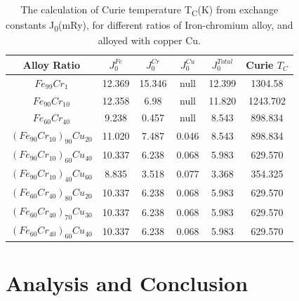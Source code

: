 \documentclass[12pt]{article}
\begin{document}
\begin{table}[h!]
\centering
 \begin{tabular}{||c c c c c c||} 
 \hline
 Alloy Ratio & $J_0^{Fe}$ & $J_0^{Cr}$ & $J_0^{Cu}$ & $J_0^{Total}$ & Curie $T_C$ \\ [1ex] 
 \hline\hline
 $Fe_{99}Cr_1$ & 12.369 & 15.346 & null & 12.399 & 1304.58 \\ 
 $Fe_{90}Cr_{10}$ & 12.358 & 6.98 & null & 11.820 & 1243.702\\
 $Fe_{60}Cr_{40}$ & 9.238 & 0.457 & null & 8.543 & 898.834 \\
 $(Fe_{90}Cr_{10})_{90}Cu_{20}$ & 11.020 & 7.487 & 0.046 & 8.543 & 898.834 \\ 
 $(Fe_{90}Cr_{10})_{60}Cu_{40}$ & 10.337 & 6.238 & 0.068 & 5.983 & 629.570 \\
 $(Fe_{90}Cr_{10})_{40}Cu_{60}$ & 8.835 & 3.518 & 0.077 & 3.368 & 354.325 \\ 
 $(Fe_{60}Cr_{40})_{80}Cu_{20}$ & 10.337 & 6.238 & 0.068 & 5.983 & 629.570 \\
 $(Fe_{60}Cr_{40})_{70}Cu_{30}$ & 10.337 & 6.238 & 0.068 & 5.983 & 629.570 \\
 $(Fe_{60}Cr_{40})_{60}Cu_{40}$ & 10.337 & 6.238 & 0.068 & 5.983 & 629.570 \\ [1ex]
 \hline
 \end{tabular}
\caption{The calculation of Curie temperature T\textsubscript{C}(K) from exchange constants J\textsubscript{0}(mRy), for different ratios of Iron-chromium alloy, and alloyed with copper Cu.} 
\end{table}

\section{Analysis and Conclusion}



\clearpage
\printbibliography
\end{document}
